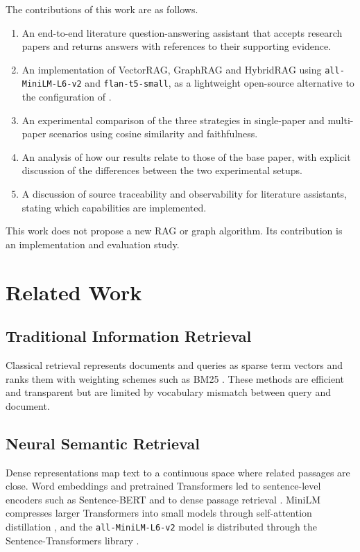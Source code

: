 \documentclass[conference]{IEEEtran}
\begin{document}
The contributions of this work are as follows.
\begin{enumerate}
\item An end-to-end literature question-answering assistant that accepts research papers and returns answers with references to their supporting evidence.
\item An implementation of VectorRAG, GraphRAG and HybridRAG using \texttt{all-MiniLM-L6-v2} and \texttt{flan-t5-small}, as a lightweight open-source alternative to the configuration of \cite{ghanadian2026base}.
\item An experimental comparison of the three strategies in single-paper and multi-paper scenarios using cosine similarity and faithfulness.
\item An analysis of how our results relate to those of the base paper, with explicit discussion of the differences between the two experimental setups.
\item A discussion of source traceability and observability for literature assistants, stating which capabilities are implemented.
\end{enumerate}
This work does not propose a new RAG or graph algorithm. Its contribution is an implementation and evaluation study.

\section{Related Work}
\subsection{Traditional Information Retrieval}
Classical retrieval represents documents and queries as sparse term vectors \cite{salton1975vsm} and ranks them with weighting schemes such as BM25 \cite{robertson2009bm25}. These methods are efficient and transparent but are limited by vocabulary mismatch between query and document.

\subsection{Neural Semantic Retrieval}
Dense representations map text to a continuous space where related passages are close. Word embeddings \cite{mikolov2013word2vec} and pretrained Transformers \cite{devlin2019bert} led to sentence-level encoders such as Sentence-BERT \cite{reimers2019sbert} and to dense passage retrieval \cite{karpukhin2020dpr}. MiniLM compresses larger Transformers into small models through self-attention distillation \cite{wang2020minilm}, and the \texttt{all-MiniLM-L6-v2} model is distributed through the Sentence-Transformers library \cite{hf_minilm}.
\end{document}
